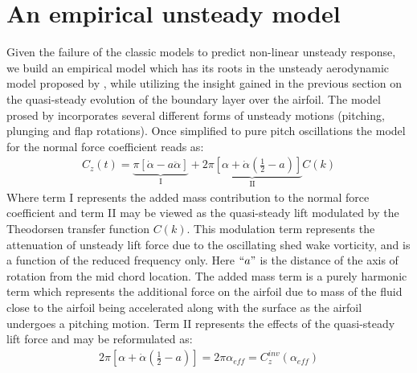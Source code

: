 \section{An empirical unsteady model}
Given the failure of the classic models to predict non-linear unsteady response, we build an empirical model which has its roots in the unsteady aerodynamic model proposed by \cite{theodorsen35}, while utilizing the insight gained in the previous section on the quasi-steady evolution of the boundary layer over the airfoil. The model prosed by \cite{theodorsen35} incorporates several different forms of unsteady motions (pitching, plunging and flap rotations). Once simplified to pure pitch oscillations the model for the normal force coefficient reads as:
\begin{align}
	C_{z}(t) = \underbrace{\pi [\dot{\alpha} - a\ddot{\alpha}]}_{\text{I}} + \underbrace{2\pi [\alpha + \dot{\alpha}(\frac{1}{2} - a)]}_{\text{II}}C(k)
\end{align}
Where term I represents the added mass contribution to the normal force coefficient and term II may be viewed as the quasi-steady lift modulated by the Theodorsen transfer function $C(k)$. This modulation term represents the attenuation of unsteady lift force due to the oscillating shed wake vorticity, and is a function of the reduced frequency only. Here $``a"$ is the distance of the axis of rotation from the mid chord location. The added mass term is a purely harmonic term which represents the additional force on the airfoil due to mass of the fluid close to the airfoil being accelerated along with the surface as the airfoil undergoes a pitching motion. Term II represents the effects of the quasi-steady lift force and may be reformulated as:
\begin{align}
	2\pi [\alpha + \dot{\alpha}(\frac{1}{2} - a)] = 2\pi\alpha_{eff} = C^{inv}_{z}(\alpha_{eff})
\end{align}

